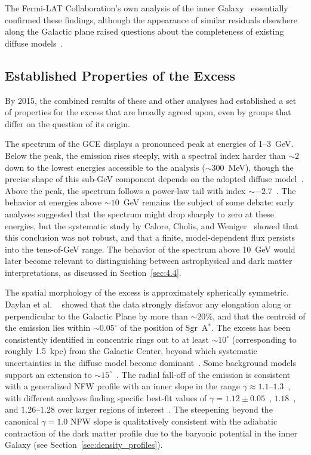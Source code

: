 The Fermi-LAT Collaboration's own analysis of the inner Galaxy~\cite{Fermi-LAT:2015sau} essentially confirmed these findings, although the appearance of similar residuals elsewhere along the Galactic plane raised questions about the completeness of existing diffuse models~\cite{Calore:2014xka}.

\subsection{Established Properties of the Excess}
\label{sec:4.2.3}

By 2015, the combined results of these and other analyses had established a set of properties for the excess that are broadly agreed upon, even by groups that differ on the question of its origin.

The spectrum of the GCE displays a pronounced peak at energies of 1--3~GeV.
Below the peak, the emission rises steeply, with a spectral index harder than $\sim 2$ down to the lowest energies accessible to the analysis ($\sim 300$~MeV), though the precise shape of this sub-GeV component depends on the adopted diffuse model~\cite{Calore:2014xka}.
Above the peak, the spectrum follows a power-law tail with index $\sim -2.7$~\cite{Calore:2014xka, Daylan:2014rsa}.
The behavior at energies above $\sim 10$~GeV remains the subject of some debate: early analyses suggested that the spectrum might drop sharply to zero at these energies, but the systematic study by Calore, Cholis, and Weniger~\cite{Calore:2014xka} showed that this conclusion was not robust, and that a finite, model-dependent flux persists into the tens-of-GeV range.
The behavior of the spectrum above 10~GeV would later become relevant to distinguishing between astrophysical and dark matter interpretations, as discussed in Section~\ref{sec:4.4}.

The spatial morphology of the excess is approximately spherically symmetric.
Daylan et al.
\ \cite{Daylan:2014rsa} showed that the data strongly disfavor any elongation along or perpendicular to the Galactic Plane by more than $\sim 20\%$, and that the centroid of the emission lies within $\sim 0.05^\circ$ of the position of Sgr~A$^*$.
The excess has been consistently identified in concentric rings out to at least $\sim 10^\circ$ (corresponding to roughly 1.5~kpc) from the Galactic Center, beyond which systematic uncertainties in the diffuse model become dominant~\cite{Daylan:2014rsa, Calore:2014xka}.
Some background models support an extension to $\sim 15^\circ$~\cite{Calore:2014xka}.
The radial fall-off of the emission is consistent with a generalized NFW profile with an inner slope in the range $\gamma \approx 1.1$--$1.3$~\cite{Daylan:2014rsa, Abazajian:2012pn, Abazajian:2014fta, Calore:2014xka}, with different analyses finding specific best-fit values of $\gamma = 1.12 \pm 0.05$~\cite{Abazajian:2012pn}, $1.18$~\cite{Daylan:2014rsa}, and $1.26$--$1.28$ over larger regions of interest~\cite{Daylan:2014rsa}.
The steepening beyond the canonical $\gamma = 1.0$ NFW slope is qualitatively consistent with the adiabatic contraction of the dark matter profile due to the baryonic potential in the inner Galaxy (see Section~\ref{sec:density_profiles}).

